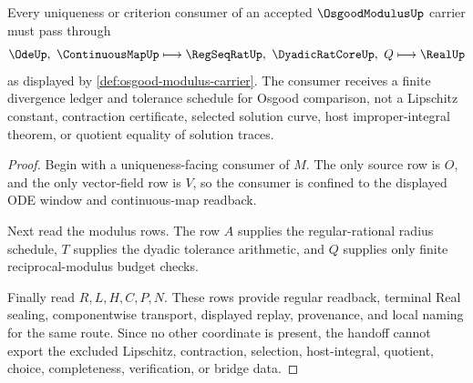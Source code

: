 \begin{theorem}
\label{thm:osgood-modulus-divergence-handoff}
Every uniqueness or criterion consumer of an accepted $\OsgoodModulusUp$ carrier must pass through
$$
\OdeUp,\ \ContinuousMapUp \longmapsto \RegSeqRatUp,\ \DyadicRatCoreUp,\ Q \longmapsto \RealUp
$$
as displayed by \autoref{def:osgood-modulus-carrier}. The consumer receives a finite divergence ledger and tolerance schedule for Osgood comparison, not a Lipschitz constant, contraction certificate, selected solution curve, host improper-integral theorem, or quotient equality of solution traces.
\end{theorem}
\begin{proof}
Begin with a uniqueness-facing consumer of $M$. The only source row is $O$, and the only vector-field row is $V$, so the consumer is confined to the displayed ODE window and continuous-map readback.

Next read the modulus rows. The row $A$ supplies the regular-rational radius schedule, $T$ supplies the dyadic tolerance arithmetic, and $Q$ supplies only finite reciprocal-modulus budget checks.

Finally read $R,L,H,C,P,N$. These rows provide regular readback, terminal Real sealing, componentwise transport, displayed replay, provenance, and local naming for the same route. Since no other coordinate is present, the handoff cannot export the excluded Lipschitz, contraction, selection, host-integral, quotient, choice, completeness, verification, or bridge data.
\end{proof}

